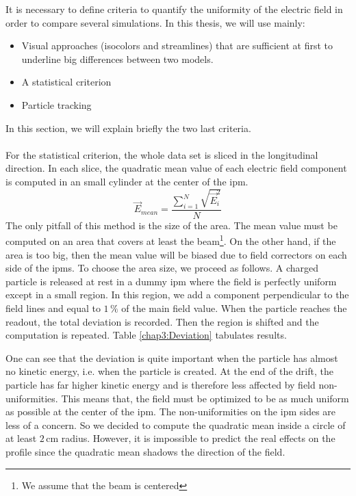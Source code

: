 \begin{refsection}
  It is necessary to define criteria to quantify the uniformity of the electric field in order to compare several simulations. In this thesis, we will use mainly:
  \begin{itemize}
    \item Visual approaches (isocolors and streamlines) that are sufficient at first to underline big differences between two models.
    \item A statistical criterion
    \item Particle tracking
  \end{itemize}
  In this section, we will explain briefly the two last criteria.

  \paragraph{}
  For the statistical criterion, the whole data set is sliced in the longitudinal direction. In each slice, the quadratic mean value of each electric field component is computed in an small cylinder at the center of the \acrshort{ipm}.
  \begin{equation}
    \vec{E}_{mean} = \frac{\sum_{i=1}^{N}\sqrt{\vec{E}_{i}^{2}}}{N}
  \end{equation}
  The only pitfall of this method is the size of the area. The mean value must be computed on an area that covers at least the beam\footnote{We assume that the beam is centered}. On the other hand, if the area is too big, then the mean value will be biased due to field correctors on each side of the \acrshort{ipm}s.
  To choose the area size, we proceed as follows. A charged particle is released at rest in a dummy \acrshort{ipm} where the field is perfectly uniform except in a small region. In this region, we add a component perpendicular to the field lines and equal to $1\,\mathrm{\%}$ of the main field value. When the particle reaches the readout, the total deviation is recorded. Then the region is shifted and the computation is repeated. Table \ref{chap3:Deviation} tabulates results.

  

  One can see that the deviation is quite important when the particle has almost no kinetic energy, i.e. when the particle is created.
  At the end of the drift, the particle has far higher kinetic energy and is therefore less affected by field non-uniformities. This means that, the field must be optimized to be as much uniform as possible at the center of the \acrshort{ipm}. The non-uniformities on the \acrshort{ipm} sides are less of a concern.
  So we decided to compute the quadratic mean inside a circle of at least $2\,\mathrm{cm}$ radius. However, it is impossible to predict the real effects on the profile since the quadratic mean shadows the direction of the field.


\end{refsection}
